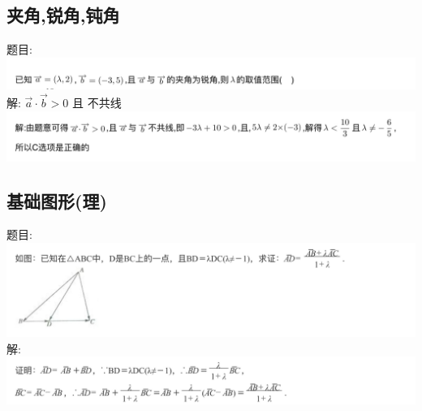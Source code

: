 \documentclass[hyperref, UTF8,11pt,a4paper]{ctexart} %
\begin{document}
\subsection{夹角,锐角,钝角}
{\color{red}  题目: } \\
\includegraphics[width=500pt]  {pic/xiangliang/jiajiaotimu.jpg} \\
解: {\color{blue}  $\vec{a} \cdot \vec{b}>0$ 且 不共线} \\
\includegraphics[width=500pt]  {pic/xiangliang/jiajiaojieda.jpg} \\


\subsection{基础图形(理)}
{\color{red}  题目: } \\
\includegraphics[width=500pt]  {pic/xiangliang/jichutuxingtimu.jpg}  \\
解: \\
\includegraphics[width=500pt]  {pic/xiangliang/jichutuxingdaan.jpg} \\

\end{document}
